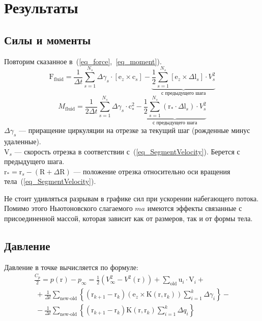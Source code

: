\documentclass[14pt]{extreport}
\newcommand{\br}[1]{\boldsymbol{\mathrm{#1}}}
\renewcommand{\vec}[1]{\br{#1}}
\begin{document}

\section{Результаты}
\subsection{Силы и моменты}

Повторим сказанное в~(\ref{eq_force},~\ref{eq_moment}).
\begin{equation}
{\vec F_\text{fluid}} = 
\frac{1}{\Delta t} \sum\limits_{s=1}^{N_s} {\Delta \gamma_s \cdot [\vec e_z \times \vec c_s]} -
\underbrace {
	\frac{1}{2} \sum\limits_{s=1}^{N_s}
		[\vec e_z \times \Delta \vec l_s] \cdot V_s^2
}_{\text{с предыдущего шага}}
\end{equation}
%
\begin{equation}
M_\text{fluid} =
\frac{1}{2\Delta t}\sum\limits_{s=1}^{N_s} { \Delta \gamma_s \cdot \vec c_*^2 }
-
\underbrace {
	\frac{1}{2} \sum\limits_{s=1}^{N_s}
		(\vec r_* \cdot \Delta \vec l_s) \cdot V_s^2
}_{\text{с предыдущего шага}}
\end{equation}
%
$\Delta \gamma_s$ --- приращение циркуляции на отрезке за текущий шаг (рожденные минус удаленные).\\
$\vec V_s$ --- скорость отрезка в соответствии с~(\ref{eq_SegmentVelocity}). Берется с предыдущего шага.\\
$\vec r_* = \vec r_s - (\vec R + \Delta \vec R)$ --- положение отрезка относительно оси вращения тела~(\ref{eq_SegmentVelocity}).

Не стоит удивляться разрывам в графике сил при ускорении набегающего потока. Помимо этого Ньютоновского слагаемого $ma$ имеются эффекты связанные с присоединенной массой, которая зависит как от размеров, так и от формы тела.

\subsection{Давление}
Давление в точке вычисляется по формуле:
\begin{multline*}
\frac{C_p}{2} = p(\br r) - p_\infty = \frac{1}{2} \left( V^2_\infty - V^2(\br r) \right) 
+\sum\limits_\text{old}{\br u_i \cdot \br V_i} + \\
\
+\frac{1}{\Delta t}\sum\limits_\text{new-old}
{\left\lbrace\left( \br r_{k+1} - \br r_k \right)\left( \br e_z \times \br K(\br r, \br r_k) \right)
\sum_{i=1}^k{\Delta\gamma_i}\right\rbrace} - \\
\
- \frac{1}{\Delta t}\sum\limits_\text{new-old}
{\left\lbrace\left( \br r_{k+1} - \br r_k \right)
\br K(\br r, \br r_k) \sum_{i=1}^k{\Delta q_i}\right\rbrace}
\end{multline*}
\end{document}

